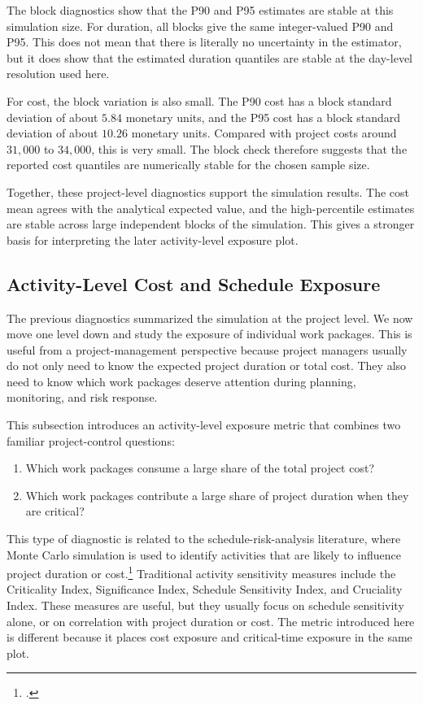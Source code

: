 \documentclass[11pt,a4paper]{article}
\newcommand{\1}{\mathbf{1}}
\theoremstyle{definition}
\theoremstyle{plain}
\theoremstyle{remark}
\numberwithin{equation}{section}
\begin{document}
The block diagnostics show that the P90 and P95 estimates are stable at this simulation size. For duration, all blocks give the same integer-valued P90 and P95. This does not mean that there is literally no uncertainty in the estimator, but it does show that the estimated duration quantiles are stable at the day-level resolution used here.

For cost, the block variation is also small. The P90 cost has a block standard deviation of about $5.84$ monetary units, and the P95 cost has a block standard deviation of about $10.26$ monetary units. Compared with project costs around $31{,}000$ to $34{,}000$, this is very small. The block check therefore suggests that the reported cost quantiles are numerically stable for the chosen sample size.

Together, these project-level diagnostics support the simulation results. The cost mean agrees with the analytical expected value, and the high-percentile estimates are stable across large independent blocks of the simulation. This gives a stronger basis for interpreting the later activity-level exposure plot.

\subsection{Activity-Level Cost and Schedule Exposure}

The previous diagnostics summarized the simulation at the project level. We now move one level down and study the exposure of individual work packages. This is useful from a project-management perspective because project managers usually do not only need to know the expected project duration or total cost. They also need to know which work packages deserve attention during planning, monitoring, and risk response.

This subsection introduces an activity-level exposure metric that combines two familiar project-control questions:

\begin{enumerate}
    \item Which work packages consume a large share of the total project cost?
    \item Which work packages contribute a large share of project duration when they are critical?
\end{enumerate}

This type of diagnostic is related to the schedule-risk-analysis literature, where Monte Carlo simulation is used to identify activities that are likely to influence project duration or cost.\footcite{hulett2000scheduleRiskAnalysis,vanhoucke2011scheduleRiskAnalysisSensitivity} Traditional activity sensitivity measures include the Criticality Index, Significance Index, Schedule Sensitivity Index, and Cruciality Index. These measures are useful, but they usually focus on schedule sensitivity alone, or on correlation with project duration or cost. The metric introduced here is different because it places cost exposure and critical-time exposure in the same plot.
\end{document}

